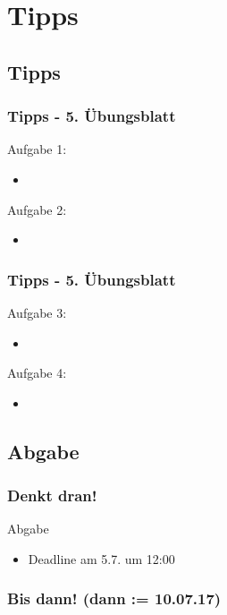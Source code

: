 \documentclass[18pt]{beamer}
\begin{document}
\section{Tipps}
	\subsection{Tipps}
	\begin{frame}
		\frametitle{Tipps - 5. Übungsblatt}
			\begin{exampleblock}{Aufgabe 1: } %
				\begin{itemize}
					\item %
				\end{itemize}
			\end{exampleblock}
			\pause
			\begin{exampleblock}{Aufgabe 2: } %
				\begin{itemize}
					\item %
				\end{itemize}
			\end{exampleblock}
	\end{frame}

	\begin{frame}
		\frametitle{Tipps - 5. Übungsblatt}
			\begin{exampleblock}{Aufgabe 3:} %
				\begin{itemize}
					\item %
				\end{itemize}
			\end{exampleblock}
			\pause
			\begin{exampleblock}{Aufgabe 4:} %
				\begin{itemize}
					\item %
				\end{itemize}
			\end{exampleblock}
	\end{frame}
	
	\subsection{Abgabe}
	\begin{frame}
		\frametitle{Denkt dran!}
		\begin{alertblock}{Abgabe}
			\begin{itemize}
				\item Deadline am 5.7. um 12:00 %
			\end{itemize}
		\end{alertblock}
	\end{frame}
		
	\begin{frame}
		\frametitle{Bis dann! (dann  := 10.07.17)}
		\centering
	\end{frame}
\end{document}
